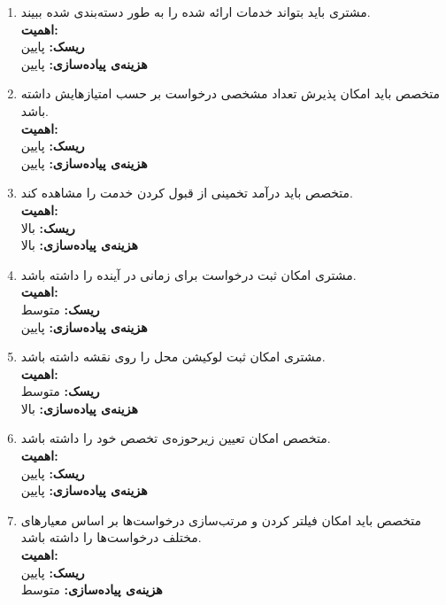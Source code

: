 \begin{enumerate}
				\item
مشتری باید بتواند خدمات ارائه شده را به طور دسته‌بندی شده ببیند.
	\\
	\textbf{اهمیت:} 
	\\
	\textbf{ریسک:} پایین
	\\
	\textbf{هزینه‌ی پیاده‌سازی:} پایین
	
	\item
	متخصص باید امکان پذیرش تعداد مشخصی درخواست بر حسب امتیازهایش داشته باشد.
	\\
	\textbf{اهمیت:} 
	\\
	\textbf{ریسک:} پایین
	\\
	\textbf{هزینه‌ی پیاده‌سازی:} پایین
	
		\item
	متخصص باید درآمد تخمینی از قبول کردن خدمت را مشاهده کند.
	\\
	\textbf{اهمیت:} 
	\\
	\textbf{ریسک:} بالا
	\\
	\textbf{هزینه‌ی پیاده‌سازی:} بالا
	
		\item
	مشتری امکان ثبت درخواست برای زمانی در آینده را داشته باشد.
	\\
	\textbf{اهمیت:} 
	\\
	\textbf{ریسک:} متوسط
	\\
	\textbf{هزینه‌ی پیاده‌سازی:} پایین
			\item
	مشتری امکان ثبت لوکیشن محل را روی نقشه داشته باشد.
	\\
	\textbf{اهمیت:} 
	\\
	\textbf{ریسک:} متوسط
	\\
	\textbf{هزینه‌ی پیاده‌سازی:} بالا
	
		\item
متخصص امکان تعیین زیرحوزه‌ی تخصص خود را داشته باشد.
	\\
	\textbf{اهمیت:} 
	\\
	\textbf{ریسک:} پایین
	\\
	\textbf{هزینه‌ی پیاده‌سازی:} پایین
	\item
متخصص باید امکان فیلتر کردن و مرتب‌سازی درخواست‌ها بر اساس معیارهای مختلف درخواست‌ها را داشته باشد.
	\\
	\textbf{اهمیت:} 
	\\
	\textbf{ریسک:} پایین
	\\
	\textbf{هزینه‌ی پیاده‌سازی:} متوسط
	
\end{enumerate}


